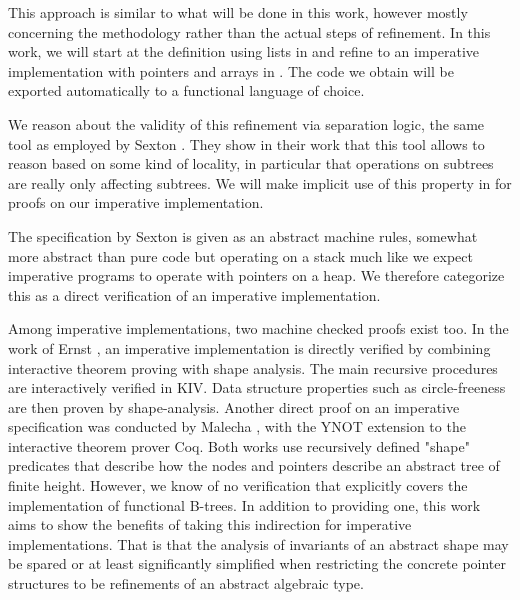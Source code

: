 This approach is similar to what will be done in this work,
however mostly concerning the methodology rather than the actual
steps of refinement.
In this work, we will start at the definition using lists in 
and refine to an imperative implementation with pointers and arrays in .
The code we obtain will be exported automatically to a functional language of choice.

We reason about the validity of this refinement via separation logic,
the same tool as employed by Sexton \parencite{DBLP:journals/entcs/SextonT08}.
They show in their work that this tool allows to reason based on some kind of locality,
in particular that operations on subtrees are really only affecting subtrees.
We will make implicit use of this property in 
for proofs on our imperative implementation.

The specification by Sexton is given as an abstract machine rules,
somewhat more abstract than pure code but operating on a stack
much like we expect imperative programs to operate with pointers on a heap.
We therefore categorize this as a direct verification of an imperative implementation.

Among imperative implementations, two machine checked proofs exist too.
In the work of Ernst \parencite{DBLP:journals/sosym/ErnstSR15},
an imperative implementation is directly verified
by combining interactive theorem proving 
with shape analysis.
The main recursive procedures are interactively verified in KIV.
Data structure properties such as circle-freeness are then proven by shape-analysis.
Another direct proof on an imperative specification 
was conducted by Malecha \parencite{DBLP:conf/popl/MalechaMSW10}, with the YNOT
extension to the interactive theorem prover Coq.
Both works use recursively defined "shape" predicates
that describe how the nodes and pointers
describe an abstract tree of finite height.
However, we know of no verification that explicitly covers
the implementation of functional B-trees.
In addition to providing one, this work aims to show the benefits
of taking this indirection for imperative implementations.
That is that the analysis of invariants of an abstract shape may be spared
or at least significantly simplified when
restricting the concrete pointer structures to be refinements
of an abstract algebraic type.
